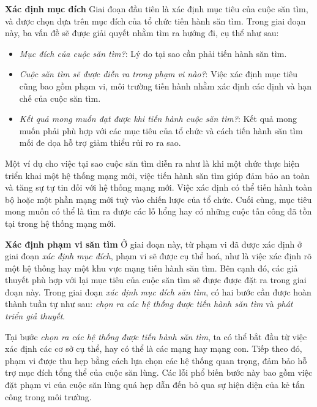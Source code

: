 \bigbreak\noindent
\textbf{Xác định mục đích}
\bigbreak\noindent
Giai đoạn đầu tiên là xác định mục tiêu của cuộc săn tìm, và được chọn dựa trên mục đích của tổ chức tiến hành săn tìm. Trong giai đoạn này, ba vấn đề sẽ được giải quyết nhằm tìm ra hướng đi, cụ thể như sau:

\begin{itemize}
    \item \textit{Mục đích của cuộc săn tìm?}: Lý do tại sao cần phải tiến hành săn tìm.
    \item \textit{Cuộc săn tìm sẽ được diễn ra trong phạm vi nào?}: Việc xác định mục tiêu cũng bao gồm phạm vi, môi trường tiến hành nhằm xác định các định và hạn chế của cuộc săn tìm.
    \item \textit{Kết quả mong muốn đạt được khi tiến hành cuộc săn tìm?}: Kết quả mong muốn phải phù hợp với các mục tiêu của tổ chức và cách tiến hành săn tìm mối đe dọa hỗ trợ giảm thiểu rủi ro ra sao.
\end{itemize}

\bigbreak\noindent
Một ví dụ cho việc tại sao cuộc săn tìm diễn ra như là khi một chức thực hiện triển khai một hệ thống mạng mới, việc tiến hành săn tìm giúp đảm bảo an toàn và tăng sự tự tin đối với hệ thống mạng mới. Việc xác định có thể tiến hành toàn bộ hoặc một phần mạng mới tuỳ vào chiến lược của tổ chức. Cuối cùng, mục tiêu mong muốn có thể là tìm ra được các lỗ hổng hay có những cuộc tấn công đã tồn tại trong hệ thống mạng mới. 

\bigbreak\noindent
\textbf{Xác định phạm vi săn tìm}
\bigbreak\noindent
Ở giai đoạn này, từ phạm vi đã được xác định ở giai đoạn \textit{xác định mục đích}, phạm vi sẽ được cụ thể hoá, như là việc xác định rõ một hệ thống hay một khu vực mạng tiến hành săn tìm. Bên cạnh đó, các giả thuyết phù hợp với lại mục tiêu của cuộc săn tìm sẽ được được đặt ra trong giai đoạn này. Trong giai đoạn \textit{xác định mục đích săn tìm}, có hai bước cần được hoàn thành tuần tự như sau: \textit{chọn ra các hệ thống được tiến hành săn tìm} và \textit{phát triển giả thuyết}.

\bigbreak\noindent
Tại bước \textit{chọn ra các hệ thống được tiến hành săn tìm}, ta có thể bắt đầu từ việc xác định các cơ sở cụ thể, hay có thể là các mạng hay mạng con. Tiếp theo đó, phạm vi được thu hẹp bằng cách lựa chọn các hệ thống quan trọng, đảm bảo hỗ trợ mục đích tổng thể của cuộc săn lùng. Các lỗi phổ biến bước này bao gồm việc đặt phạm vi của cuộc săn lùng quá hẹp dẫn đến bỏ qua sự hiện diện của kẻ tấn công trong môi trường.

